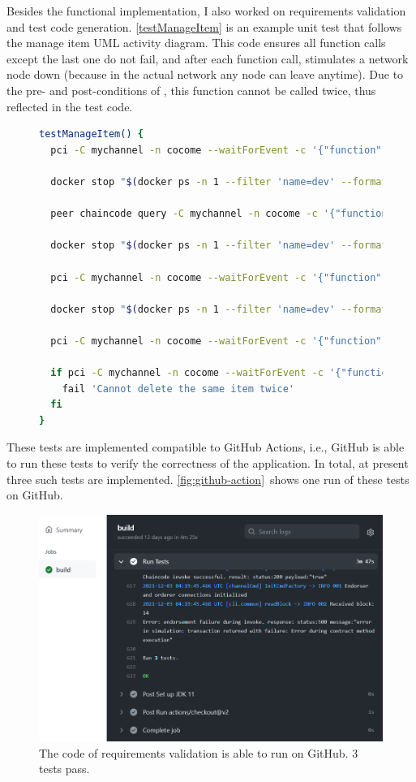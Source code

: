 Besides the functional implementation, I also worked on requirements validation and test code generation. \autoref{testManageItem} is an example unit test that follows the manage item UML activity diagram. This code ensures all function calls except the last one do not fail, and after each function call,  stimulates a network node down (because in the actual network any node can leave anytime). Due to the pre- and post-conditions of , this function cannot be called twice, thus reflected in the test code.


\begin{figure}[ht]
\begin{lstlisting}[language=bash, breaklines=true, showstringspaces=false, frame=tb, caption={A Bash function that tests operations in the manage item category}, label=testManageItem]
testManageItem() {
  pci -C mychannel -n cocome --waitForEvent -c '{"function":"ManageItemCRUDServiceImpl:createItem","Args":["1","cookies","10","10","9"]}' || fail

  docker stop "$(docker ps -n 1 --filter 'name=dev' --format '{{.ID}}')"

  peer chaincode query -C mychannel -n cocome -c '{"function":"ManageItemCRUDServiceImpl:queryItem","Args":["1"]}' || fail

  docker stop "$(docker ps -n 1 --filter 'name=dev' --format '{{.ID}}')"

  pci -C mychannel -n cocome --waitForEvent -c '{"function":"ManageItemCRUDServiceImpl:modifyItem","Args":["1","Pepperidge farm cookies","12","5","10"]}' || fail

  docker stop "$(docker ps -n 1 --filter 'name=dev' --format '{{.ID}}')"

  pci -C mychannel -n cocome --waitForEvent -c '{"function":"ManageItemCRUDServiceImpl:deleteItem","Args":["1"]}' || fail

  if pci -C mychannel -n cocome --waitForEvent -c '{"function":"ManageItemCRUDServiceImpl:deleteItem","Args":["1"]}'; then
    fail 'Cannot delete the same item twice'
  fi
}
\end{lstlisting}
\end{figure}

These tests are implemented compatible to GitHub Actions, i.e., GitHub is able to run these tests to verify the correctness of the application. In total, at present three such tests are implemented. \autoref{fig:github-action}~shows one run of these tests on GitHub.

\begin{figure}[ht]
\centering
\includegraphics[width=0.9\linewidth]{github-action}
\caption{The code of requirements validation is able to run on GitHub. 3 tests pass.}
\label{fig:github-action}
\end{figure}

